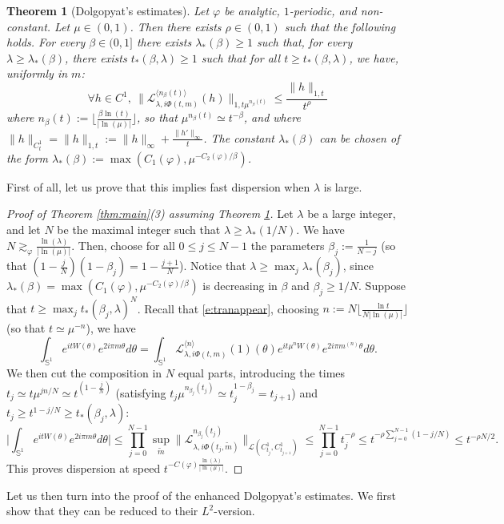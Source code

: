 \documentclass[11pt]{amsart}
\theoremstyle{plain}
\newtheorem{theorem}{Theorem}[section]
\theoremstyle{definition}
\numberwithin{equation}{section}
\begin{document}
\begin{theorem}[Dolgopyat's estimates]\label{thm:trueDolgopyat}
Let $\varphi$ be analytic, $1$-periodic, and non-constant. Let $\mu \in (0,1)$. Then there exists $\rho \in (0,1)$ such that the following holds. For every $\beta\in(0,1]$ there exists $\lambda_*(\beta)\geq1$ such that, for every $\lambda\geq\lambda_*(\beta)$, there exists $t_*(\beta,\lambda)\geq1$ such that for all $t \geq t_*(\beta,\lambda)$, we have, uniformly in $m$:
$$ \forall h \in C^{1}, \ \Big\| \mathcal{L}_{\lambda,i\Phi(t,m)}^{\langle n_\beta(t) \rangle}(h) \Big\|_{1,{t \mu^{n_\beta(t)}}} \leq \frac{\|h\|_{1,t}}{t^\rho} $$
where $n_\beta(t) := \Big\lfloor \frac{\beta \ln(t)}{|\ln(\mu)|} \Big\rfloor $, so that $\mu^{n_\beta(t)} \simeq t^{-\beta}$, and where $\|h\|_{C^1_t} = \|h\|_{1,t} := \|h\|_\infty+\frac{\|h'\|_{\infty}}{t}$. The constant $\lambda_*(\beta)$ can be chosen of the form $\lambda_*(\beta) := \max(C_1(\varphi),\mu^{-C_2(\varphi)/\beta})$.
\end{theorem}

First of all, let us prove that this implies fast dispersion when $\lambda$ is large.

\begin{proof}[Proof of Theorem \ref{thm:main}(3) assuming Theorem \ref{thm:trueDolgopyat}]
Let $\lambda$ be a large integer, and let $N$ be the maximal integer such that $\lambda \geq \lambda_*(1/N)$. We have $N \gtrsim_{\varphi} \frac{\ln(\lambda)}{|\ln(\mu)|}$. Then, choose for all $0 \leq j \leq N-1$ the parameters $\beta_j := \frac{1}{N-j}$ (so that $(1-\frac{j}{N})(1-\beta_j) = 1-\frac{j+1}{N}$). Notice that $\lambda \geq \max_j \lambda_*(\beta_j)$, since $\lambda_*(\beta)=\max(C_1(\varphi),\mu^{-C_2(\varphi)/\beta})$ is decreasing in $\beta$ and $\beta_j\geq 1/N$. Suppose that $t \geq \max_j t_*(\beta_j,\lambda)^N$. Recall that \eqref{e:tranappear}, choosing $n := N \lfloor \frac{\ln t}{N|\ln(\mu)|} \rfloor $ (so that $t \simeq \mu^{-n}$), we have
$$ \int_{\mathbb{S}^1} e^{i t W(\theta)} e^{2 i \pi m \theta} d\theta = \int_{\mathbb{S}^1} \mathcal{L}_{\lambda,i \Phi(t,m)}^{\langle n \rangle}(1)(\theta) e^{i t \mu^n W(\theta)} e^{2 i \pi m^{(n)}\theta} d\theta. $$
We then cut the composition in $N$ equal parts, introducing the times $t_j \simeq t \mu^{jn/N} \simeq t^{(1-\frac{j}{N})}$ (satisfying $t_{j} \mu^{n_{\beta_j}(t_{j})}\simeq t_j^{1-\beta_j}=t_{j+1}$) and $t_j \geq t^{1-j/N} \geq t_*(\beta_j,\lambda)$:
$$ \Big| \int_{\mathbb{S}^1} e^{i t W(\theta)} e^{2 i \pi m \theta} d\theta  \Big| \leq \prod_{j=0}^{N-1} \sup_{\tilde m} \| \mathcal{L}_{\lambda,i\Phi(t_j,\tilde{m})}^{n_{\beta_j}(t_j)} \|_{\mathcal{L}({C}^{1}_{t_{j}} , {C^{1}_{t_{j+1}}})}  \leq \prod_{j=0}^{N-1} t_j^{-\rho} \leq t^{-\rho \sum_{j=0}^{N-1} (1-j/N)} \leq t^{-\rho N/2}. $$
This proves dispersion at speed $t^{-C(\varphi) \frac{\ln(\lambda)}{|\ln(\mu)|}}$.
\end{proof}
Let us then turn into the proof of the enhanced Dolgopyat's estimates. We first show that they can be reduced to their $L^2$-version.
\end{document}
